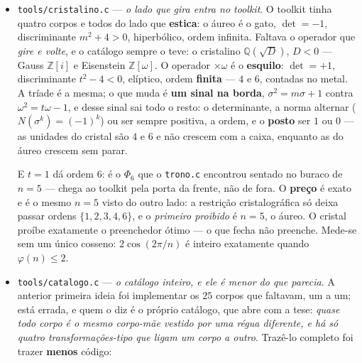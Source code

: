 \documentclass[11pt]{article}
\newcommand{\code}[1]{\texttt{\small #1}}
\newcommand{\Z}{\mathbb Z}
\newcommand{\Q}{\mathbb Q}
\theoremstyle{plain}
\theoremstyle{remark}
\begin{document}
\begin{itemize}
Gato e esquilo têm assinatura medível --- $\det$ e discriminante --- então a pergunta se decide
lendo números, não escolhendo nome. Sai assim, e separado: o \textbf{gato está na escada}, porque
$d(m) = m^2+4$ \emph{é} o discriminante de $A_m = [[m,1],[1,0]]$ e $\sqrt{d(m)} = \sigma + 1/\sigma$
é a sua abertura --- converter mineral em ouro é dividir pela abertura ao quadrado. O \textbf{passo}
de preencher um nível \emph{não} é o gato: é cisalhamento, $\det = +1$ e discriminante $0$,
parabólico. A \textbf{volta} é esse mesmo cisalhamento com o sinal trocado, produto igual à
identidade em inteiros --- a reconstrução não tem máquina própria. E o \textbf{esquilo} que age é
a \emph{involução} de ordem $2$, o $r=2$ onde o hipociclo degenera na reta, não uma rotação de
ordem maior.

E o que faz disso \textbf{uma} peça e não duas: os dois autovalores do mesmo gato são $\sigma$ e
$-1/\sigma$, de produto $-1$. \emph{Um estica, o outro contrai}, e o produto é $1$ exato --- que é
o $\det = -1$ lido de outro jeito. Por isso a volta é exata: a contração é a recíproca da esticada,
não uma aproximação dela. E a inversa é \textbf{inteira}, $[[0,1],[1,-m]]$, o mesmo gato com
$m \mapsto -m$ --- a antípoda, a peça virada, e não uma segunda máquina inventada para a volta.
\item \code{tools/cristalino.c} --- \emph{o lado que gira entra no toolkit}. O toolkit tinha
quatro corpos e todos do lado que \textbf{estica}: o áureo é o gato, $\det = -1$, discriminante
$m^2+4>0$, hiperbólico, ordem infinita. Faltava o operador que \emph{gire e volte}, e o catálogo
sempre o teve: o cristalino $\Q(\sqrt{D})$, $D<0$ --- Gauss $\Z[i]$ e Eisenstein $\Z[\omega]$.
O operador $\times\omega$ é o \textbf{esquilo}: $\det = +1$, discriminante $t^2-4<0$, elíptico,
ordem \textbf{finita} --- $4$ e $6$, contadas no metal. A tríade é a mesma; o que muda é
\textbf{um sinal na borda}, $\sigma^2 = m\sigma+1$ contra $\omega^2 = t\omega-1$, e desse sinal
sai todo o resto: o determinante, a norma alternar ($N(\sigma^k) = (-1)^k$) ou ser sempre positiva,
a ordem, e o \textbf{posto} ser $1$ ou $0$ --- as unidades do cristal são $4$ e $6$ e não crescem
com a caixa, enquanto as do áureo crescem sem parar.

E $t=1$ dá ordem $6$: é o $\Phi_6$ que o \code{trono.c} encontrou sentado no buraco de $n=5$ ---
chega ao toolkit pela porta da frente, não de fora. O \textbf{preço} é exato e é o mesmo $n=5$
visto do outro lado: a restrição cristalográfica só deixa passar ordens $\{1,2,3,4,6\}$, e o
\emph{primeiro proibido} é $n=5$, o áureo. O cristal proíbe exatamente o preenchedor ótimo --- o
que fecha não preenche. Mede-se sem um único cosseno: $2\cos(2\pi/n)$ é inteiro exatamente quando
$\varphi(n) \le 2$.
\item \code{tools/catalogo.c} --- \emph{o catálogo inteiro, e ele é menor do que parecia}.
A anterior primeira ideia foi implementar os $25$ corpos que faltavam, um a um; está errada, e quem o
diz é o próprio catálogo, que abre com a tese: \emph{quase todo corpo é o mesmo corpo-mãe vestido
por uma régua diferente, e há só quatro transformações-tipo que ligam um corpo a outro}. Trazê-lo
completo foi trazer \textbf{menos} código:


\end{itemize}
\end{document}
